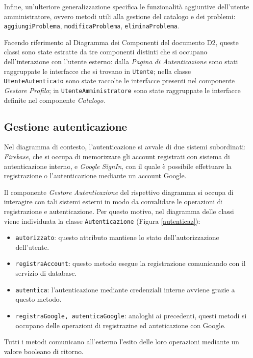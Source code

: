 \documentclass[11pt, a4paper]{article}
\theoremstyle{definition} %
\begin{document}
Infine, un'ulteriore generalizzazione specifica le funzionalità aggiuntive
dell'utente amministratore, ovvero metodi utili alla gestione del catalogo
e dei problemi:
\texttt{aggiungiProblema}, \texttt{modificaProblema}, \texttt{eliminaProblema}.


Facendo riferimento al Diagramma dei Componenti del
documento D2, queste classi sono state estratte da tre componenti
distinti che si occupano dell'interazione con l'utente esterno: dalla
\textit{Pagina di Autenticazione} sono stati raggruppate le interfacce che
si trovano in \texttt{Utente}; nella classe \texttt{UtenteAutenticato} sono state
raccolte le interfacce presenti nel componente \textit{Gestore Profilo};
in \texttt{UtenteAmministratore} sono state raggruppate le interfacce
definite nel componente \textit{Catalogo}.


\subsection{Gestione autenticazione}
Nel diagramma di contesto, l'autenticazione si avvale di due sistemi
subordinati: \textit{Firebase}, che si occupa di memorizzare gli account
registrati con sistema di autenticazione interno, e \textit{Google SignIn},
con il quale è possibile effettuare la registrazione o l'autenticazione
mediante un account Google.

Il componente \textit{Gestore Autenticazione} del rispettivo diagramma si
occupa di interagire con tali sistemi esterni in modo da convalidare le
operazioni di registrazione e autenticazione. Per questo motivo, nel diagramma
delle classi viene individuata la classe \texttt{Autenticazione} (Figura \ref{autenticaz}):
\begin{itemize}
    \item \texttt{autorizzato}: questo attributo mantiene lo stato dell'autorizzazione
    dell'utente.

    \item \texttt{registraAccount}: questo metodo esegue la registrazione
    comunicando con il servizio di database.
    \item \texttt{autentica}: l'autenticazione mediante credenziali interne
    avviene grazie a questo metodo.
    \item \texttt{registraGoogle, autenticaGoogle}: analoghi ai precedenti,
    questi metodi si occupano delle operazioni di registrazine ed auteticazione
    con Google.
\end{itemize}
Tutti i metodi comunicano all'esterno l'esito delle loro operazioni mediante
un valore booleano di ritorno.
\end{document}
